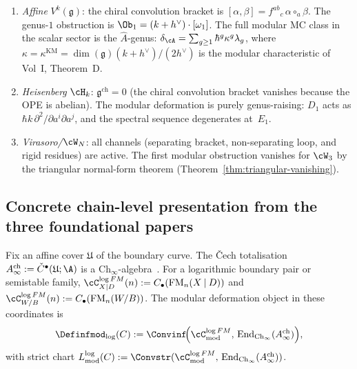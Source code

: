\begin{computation}
\label{comp:genus-completion-standard}
\begin{enumerate}[label=\textup{(\alph*)}]
\item \emph{Affine} $V^k(\mathfrak{g})$:
 the chiral convolution bracket is
 $[\alpha,\beta] = f^{ab}{}_c\, \alpha \circ_a \beta$.
 The genus-$1$ obstruction is
 $\Ob_1 = (k + h^\vee) \cdot [\omega_1]$.
 The full modular MC class in the scalar sector is the
 $\hat{A}$-genus:
 $\delta_\cA = \sum_{g \ge 1} \hbar^g \kappa^g \lambda_g$,
 where $\kappa = \kappa^{\mathrm{KM}} = \dim(\mathfrak{g})(k+h^\vee)/(2h^\vee)$
 is the modular characteristic of Vol~I, Theorem~D.

\item \emph{Heisenberg} $\cH_k$:
 $\mathfrak{g}^{\mathrm{ch}} = 0$ (the chiral convolution
 bracket vanishes because the OPE is abelian). The modular
 deformation is purely genus-raising:
 $D_1$ acts as $\hbar k\, \partial^2/\partial a^i \partial a^j$,
 and the spectral sequence degenerates at~$E_1$.

\item \emph{Virasoro/\/$\cW_N$}:
 all channels (separating bracket, non-separating loop, and
 rigid residues) are active. The first modular obstruction
 vanishes for $\cW_3$ by the triangular normal-form theorem
 (Theorem~\ref{thm:triangular-vanishing}).
\end{enumerate}
\end{computation}

\subsection{Concrete chain-level presentation from the three foundational papers}
\label{subsec:vol2-three-preprints-chain-level}

\begin{construction}
\label{const:vol2-three-preprints-chain-level}
Fix an affine cover $\mathfrak U$ of the boundary curve.
The \v{C}ech totalisation
$A^{\mathrm{ch}}_\infty := \check C^\bullet(\mathfrak U;\A)$
is a $\mathrm{Ch}_\infty$-algebra~\cite[Theorem~3.1]{MS24}.
For a logarithmic boundary pair or semistable family,
$\cC^{\log FM}_{X\mathbin{|}D}(n):=C_\bullet(\operatorname{FM}_n(X\mathbin{|}D))$
and $\cC^{\log FM}_{W/B}(n):=C_\bullet(\operatorname{FM}_n(W/B))$.
The modular deformation object in these coordinates is
\[
{\Definfmod}_{\log}(C)
:=
\Convinf\!\Bigl(
\cC^{\log FM}_{\mathrm{mod}},\,
\operatorname{End}_{\mathrm{Ch}_\infty}(A^{\mathrm{ch}}_\infty)
\Bigr),
\]
with strict chart
$L^{\log}_{\mathrm{mod}}(C)
:=
\Convstr(\cC^{\log FM}_{\mathrm{mod}},\,
\operatorname{End}_{\mathrm{Ch}_\infty}(A^{\mathrm{ch}}_\infty))$.
\end{construction}

